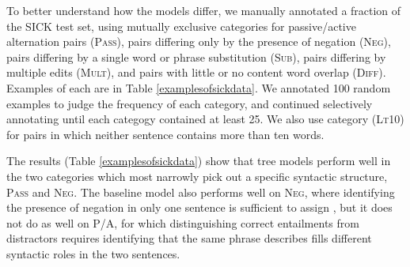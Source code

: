 To better understand how the models differ, we manually annotated a fraction of the SICK test set, using mutually exclusive categories for passive/active alternation pairs (\textsc{Pass}), pairs differing only by the presence of negation (\textsc{Neg}), pairs differing by a single word or phrase substitution (\textsc{Sub}), pairs differing by multiple edits (\textsc{Mult}), and pairs with little or no content word overlap (\textsc{Diff}). Examples of each are in Table \ref{examplesofsickdata}. We annotated 100 random examples to judge the frequency of each category, and  continued selectively annotating until each categogy contained at least 25. We also use category (\textsc{Lt10}) for pairs in which neither sentence contains more than ten words.
 
The results (Table \ref{examplesofsickdata}) show that tree models perform well in the two categories which most narrowly pick out a specific syntactic structure, \textsc{Pass} and \textsc{Neg}. The baseline model also performs well on \textsc{Neg}, where identifying the presence of negation in only one sentence is sufficient to assign , but it does not do as well on P/A, for which distinguishing correct entailments from distractors requires identifying that the same phrase describes fills different syntactic roles in the two sentences. 